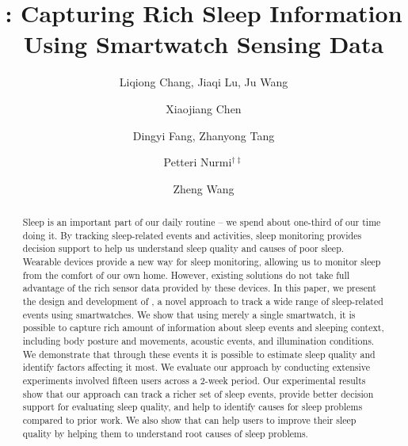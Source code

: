 \documentclass[acmlarge]{acmart}
\begin{document}
\title{\systemname: Capturing Rich Sleep Information Using Smartwatch Sensing Data}

\author{Liqiong Chang, Jiaqi Lu, Ju Wang}
\author{Xiaojiang Chen}
\author{Dingyi Fang, Zhanyong Tang}
 

\author{Petteri Nurmi$^{\dag\ddag}$}
 

\author{Zheng Wang}
 


\begin{abstract}
Sleep is an important part of our daily routine -- we spend about one-third of our time doing it. By tracking sleep-related events and activities, sleep monitoring provides decision support to help us understand sleep quality and  causes of poor sleep. Wearable devices provide a new way for sleep monitoring, allowing us to monitor sleep from the comfort of our own home. However, existing  solutions do not take full advantage of the rich sensor data provided by these devices. In this paper, we present the design and development of {\systemname}, a novel approach to track a wide range of sleep-related events using smartwatches. We show that using merely a single smartwatch, it is possible to capture rich amount of information about sleep events and sleeping context, including body posture and movements, acoustic events, and illumination conditions. We demonstrate that through these events it is possible to estimate sleep quality and identify factors affecting it most. We evaluate our approach by conducting extensive experiments involved fifteen users across a 2-week period. Our experimental results show that our approach can track a richer set of sleep events, provide better decision support for evaluating sleep quality, and help to identify causes for sleep problems compared to prior work. We also show that {\systemname} can help users to improve their sleep quality by helping them to understand root causes of sleep problems.
\end{abstract}
\end{document}
